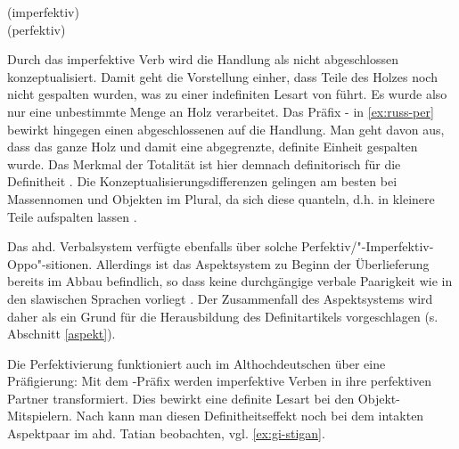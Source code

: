 \begin{exe}
	\ex \label{ex:russ-aspekt}   
	\begin{xlist}
		\ex \label{ex:russ-imper}  (imperfektiv) \\ 
		\ex \label{ex:russ-per}  (perfektiv) \\ 
		\end{xlist}
\end{exe}
\noindent
Durch das imperfektive Verb  wird die Handlung als nicht abgeschlossen konzeptualisiert. Damit  geht die Vorstellung einher, dass Teile des Holzes noch nicht gespalten wurden, was zu einer indefiniten Lesart von   führt. Es wurde also nur eine unbestimmte Menge an Holz verarbeitet. Das Präfix - in \ref{ex:russ-per} bewirkt hingegen einen abgeschlossenen   auf die Handlung. Man geht davon aus, dass das ganze Holz und damit eine abgegrenzte, definite Einheit gespalten wurde.
Das Merkmal der Totalität ist hier demnach definitorisch für die Definitheit \parencite[14]{Leiss2000}. Die Konzeptualisierungsdifferenzen gelingen am besten bei Massennomen und Objekten im Plural, da sich diese quanteln, d.h. in kleinere Teile aufspalten lassen \parencite{Heindl2016}. 

Das ahd. Verbalsystem verfügte ebenfalls über solche Perfektiv/"-Imperfektiv-Oppo"-sitionen. Allerdings ist das Aspektsystem zu Beginn der Überlieferung bereits im Abbau befindlich, so dass keine durchgängige verbale Paarigkeit wie in den slawischen Sprachen vorliegt \parencite[3]{Eroms1997}. Der Zusammenfall des Aspektsystems wird daher als ein Grund für die Herausbildung des Definitartikels vorgeschlagen (s. Abschnitt \ref{aspekt}). 


Die Perfektivierung funktioniert auch im Althochdeutschen über eine Präfigierung: Mit dem -Präfix werden imperfektive Verben in ihre perfektiven Partner transformiert. Dies bewirkt eine definite Lesart bei den Objekt-Mitspielern. Nach \textcite[176-181]{Leiss2000} kann man diesen Definitheitseffekt noch bei dem intakten Aspektpaar  im ahd. Tatian beobachten, vgl. \ref{ex:gi-stigan}. 

